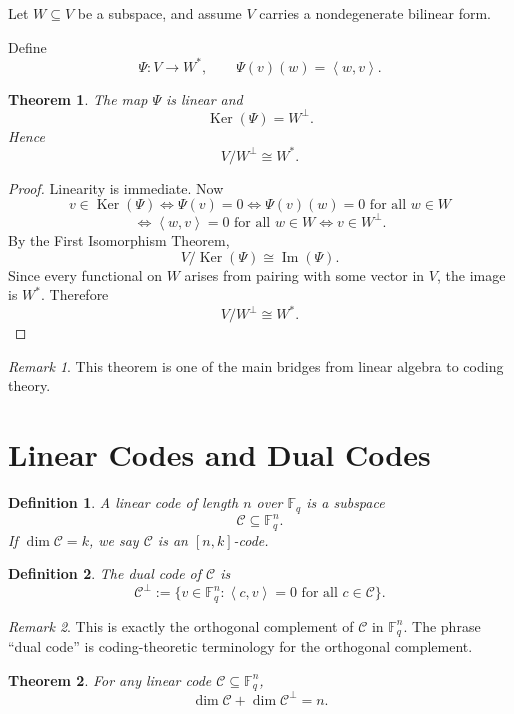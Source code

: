\documentclass[11pt]{article}
\newtheorem{definition}{Definition}
\newtheorem{theorem}{Theorem}
\theoremstyle{remark}
\newtheorem{remark}{Remark}
\newcommand{\F}{\mathbb{F}}
\newcommand{\C}{\mathcal{C}}
\newcommand{\Cp}{\mathcal{C}^{\perp}}
\newcommand{\ip}[2]{\left\langle #1,#2\right\rangle}
\newcommand{\Ker}{\operatorname{Ker}}
\newcommand{\im}{\operatorname{Im}}
\begin{document}
	Let \(W\subseteq V\) be a subspace, and assume \(V\) carries a nondegenerate bilinear form.
	
	Define
	\[
	\Psi:V\to W^*,\qquad \Psi(v)(w)=\ip{w}{v}.
	\]
	
	\begin{theorem}
		The map \(\Psi\) is linear and
		\[
		\Ker(\Psi)=W^\perp.
		\]
		Hence
		\[
		V/W^\perp \cong W^*.
		\]
	\end{theorem}
	
	\begin{proof}
		Linearity is immediate. Now
		\[
		v\in \Ker(\Psi)
		\iff \Psi(v)=0
		\iff \Psi(v)(w)=0 \text{ for all } w\in W
		\]
		\[
		\iff \ip{w}{v}=0 \text{ for all } w\in W
		\iff v\in W^\perp.
		\]
		By the First Isomorphism Theorem,
		\[
		V/\Ker(\Psi)\cong \im(\Psi).
		\]
		Since every functional on \(W\) arises from pairing with some vector in \(V\), the image is \(W^*\). Therefore
		\[
		V/W^\perp\cong W^*.
		\]
	\end{proof}
	
	\begin{remark}
		This theorem is one of the main bridges from linear algebra to coding theory.
	\end{remark}
	
	\section{Linear Codes and Dual Codes}
	
	\begin{definition}
		A \emph{linear code} of length \(n\) over \(\F_q\) is a subspace
		\[
		\C \subseteq \F_q^n.
		\]
		If \(\dim \C = k\), we say \(\C\) is an \([n,k]\)-code.
	\end{definition}
	
	\begin{definition}
		The \emph{dual code} of \(\C\) is
		\[
		\Cp := \{v\in \F_q^n : \ip{c}{v}=0 \text{ for all } c\in \C\}.
		\]
	\end{definition}
	
	\begin{remark}
		This is exactly the orthogonal complement of \(\C\) in \(\F_q^n\). The phrase ``dual code'' is coding-theoretic terminology for the orthogonal complement.
	\end{remark}
	
	\begin{theorem}
		For any linear code \(\C\subseteq \F_q^n\),
		\[
		\dim \C + \dim \Cp = n.
		\]
	\end{theorem}
	
\end{document}
